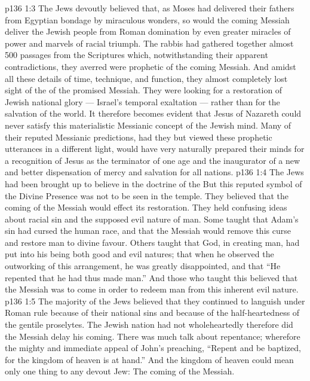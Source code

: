 \vs p136 1:3 The Jews devoutly believed that, as Moses had delivered their fathers from Egyptian bondage by miraculous wonders, so would the coming Messiah deliver the Jewish people from Roman domination by even greater miracles of power and marvels of racial triumph. The rabbis had gathered together almost 500 passages from the Scriptures which, notwithstanding their apparent contradictions, they averred were prophetic of the coming Messiah. And amidst all these details of time, technique, and function, they almost completely lost sight of the  of the promised Messiah. They were looking for a restoration of Jewish national glory --- Israel’s temporal exaltation --- rather than for the salvation of the world. It therefore becomes evident that Jesus of Nazareth could never satisfy this materialistic Messianic concept of the Jewish mind. Many of their reputed Messianic predictions, had they but viewed these prophetic utterances in a different light, would have very naturally prepared their minds for a recognition of Jesus as the terminator of one age and the inaugurator of a new and better dispensation of mercy and salvation for all nations.
\vs p136 1:4 \pc The Jews had been brought up to believe in the doctrine of the  But this reputed symbol of the Divine Presence was not to be seen in the temple. They believed that the coming of the Messiah would effect its restoration. They held confusing ideas about racial sin and the supposed evil nature of man. Some taught that Adam’s sin had cursed the human race, and that the Messiah would remove this curse and restore man to divine favour. Others taught that God, in creating man, had put into his being both good and evil natures; that when he observed the outworking of this arrangement, he was greatly disappointed, and that “He repented that he had thus made man.” And those who taught this believed that the Messiah was to come in order to redeem man from this inherent evil nature.
\vs p136 1:5 The majority of the Jews believed that they continued to languish under Roman rule because of their national sins and because of the half\hyp{}heartedness of the gentile proselytes. The Jewish nation had not wholeheartedly  therefore did the Messiah delay his coming. There was much talk about repentance; wherefore the mighty and immediate appeal of John’s preaching, “Repent and be baptized, for the kingdom of heaven is at hand.” And the kingdom of heaven could mean only one thing to any devout Jew: The coming of the Messiah.
